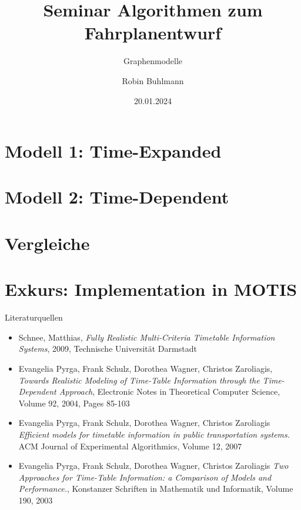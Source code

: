 \documentclass[
	ngerman,
	aspectratio=43,
	color={accentcolor=11c},
	logo=false,
	colorframetitle=false,
	]{tudabeamer}
\title{Seminar Algorithmen zum Fahrplanentwurf}
\subtitle{Graphenmodelle}
\author[R. Buhlmann]{Robin Buhlmann}
\date{20.01.2024}
\begin{document}
\maketitle



\section{Modell 1: Time-Expanded}


\section{Modell 2: Time-Dependent}


\section{Vergleiche}


\section{Exkurs: Implementation in MOTIS}





\begin{frame}{Literaturquellen}
	\begin{itemize}
		\item Schnee, Matthias, \textit{Fully Realistic Multi-Criteria Timetable Information Systems}, 2009, Technische Universität Darmstadt
		\item Evangelia Pyrga, Frank Schulz, Dorothea Wagner, Christos Zaroliagis, \textit{Towards Realistic Modeling of Time-Table Information through the Time-Dependent Approach}, Electronic Notes in Theoretical Computer Science, Volume 92, 2004, Pages 85-103
		\item Evangelia Pyrga, Frank Schulz, Dorothea Wagner, Christos Zaroliagis \textit{Efficient models for timetable information in public transportation systems.} ACM Journal of Experimental Algorithmics, Volume 12, 2007
		\item Evangelia Pyrga, Frank Schulz, Dorothea Wagner, Christos Zaroliagis  \textit{Two Approaches for Time-Table Information: a Comparison of Models and Performance.}, Konstanzer Schriften in Mathematik und Informatik, Volume 190, 2003
\end{itemize}
\end{frame}
\end{document}
